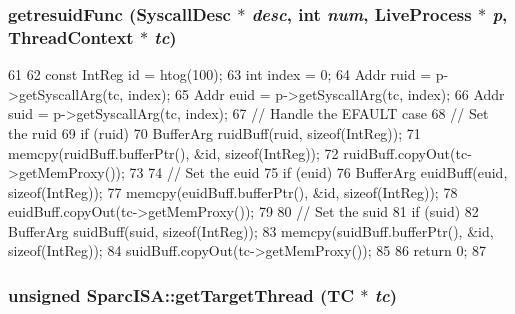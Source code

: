 \label{namespaceSparcISA_a49dee5cc438e190bcdb1756438219536}
\hypertarget{namespaceSparcISA_a313b9d62bcf3a577491d7411bf69088b}{
\subsubsection[{getresuidFunc}]{ getresuidFunc ({\bf SyscallDesc} $\ast$ {\em desc}, \/  int {\em num}, \/  {\bf LiveProcess} $\ast$ {\em p}, \/  {\bf ThreadContext} $\ast$ {\em tc})}}
\label{namespaceSparcISA_a313b9d62bcf3a577491d7411bf69088b}



\begin{DoxyCode}
61 {
62     const IntReg id = htog(100);
63     int index = 0;
64     Addr ruid = p->getSyscallArg(tc, index);
65     Addr euid = p->getSyscallArg(tc, index);
66     Addr suid = p->getSyscallArg(tc, index);
67     // Handle the EFAULT case
68     // Set the ruid
69     if (ruid) {
70         BufferArg ruidBuff(ruid, sizeof(IntReg));
71         memcpy(ruidBuff.bufferPtr(), &id, sizeof(IntReg));
72         ruidBuff.copyOut(tc->getMemProxy());
73     }
74     // Set the euid
75     if (euid) {
76         BufferArg euidBuff(euid, sizeof(IntReg));
77         memcpy(euidBuff.bufferPtr(), &id, sizeof(IntReg));
78         euidBuff.copyOut(tc->getMemProxy());
79     }
80     // Set the suid
81     if (suid) {
82         BufferArg suidBuff(suid, sizeof(IntReg));
83         memcpy(suidBuff.bufferPtr(), &id, sizeof(IntReg));
84         suidBuff.copyOut(tc->getMemProxy());
85     }
86     return 0;
87 }
\end{DoxyCode}
\hypertarget{namespaceSparcISA_a4ea507861bd4ae5fdd7f3e99f20f8333}{
\subsubsection[{getTargetThread}]{\setlength{\rightskip}{0pt plus 5cm}unsigned SparcISA::getTargetThread (TC $\ast$ {\em tc})}}
\label{namespaceSparcISA_a4ea507861bd4ae5fdd7f3e99f20f8333}




